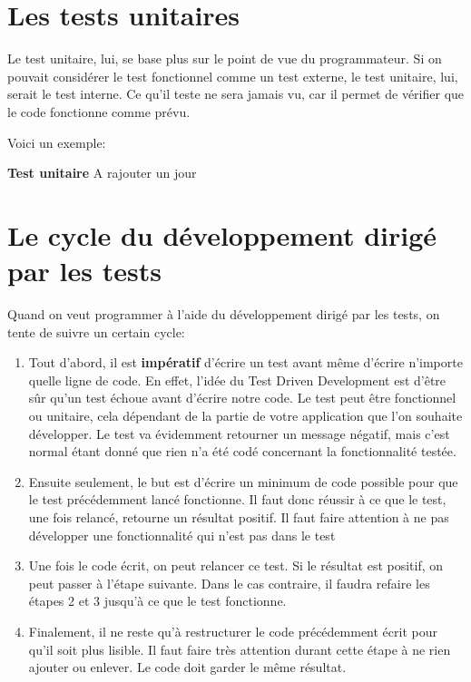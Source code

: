 \documentclass[letterpaper,10pt,french]{sphinxmanual}
\begin{document}
\section{Les tests unitaires}
\label{tdd:les-tests-unitaires}
Le test unitaire, lui, se base plus sur le point de vue du programmateur. Si on
pouvait considérer le test fonctionnel comme un test externe, le test unitaire,
lui, serait le test interne. Ce qu'il teste ne sera jamais vu, car il permet de
vérifier que le code fonctionne comme prévu.

Voici un exemple:

\textbf{Test unitaire} A rajouter un jour


\section{Le cycle du développement dirigé par les tests}
\label{tdd:le-cycle-du-developpement-dirige-par-les-tests}
Quand on veut programmer à l'aide du développement dirigé par les tests, on
tente de suivre un certain cycle:
\begin{enumerate}
\item {} 
Tout d'abord, il est \textbf{impératif} d'écrire un test avant même d'écrire
n'importe quelle ligne de code. En effet, l'idée du Test Driven Development
est d'être sûr qu'un test échoue avant d'écrire notre code. Le test peut
être fonctionnel ou unitaire, cela dépendant de la partie de votre
application que l'on souhaite développer. Le test va évidemment retourner
un message négatif, mais c'est normal étant donné que rien n'a été codé
concernant la fonctionnalité testée.

\item {} 
Ensuite seulement, le but est d'écrire un minimum de code possible
pour que le test précédemment lancé fonctionne. Il faut donc réussir
à ce que le test, une fois relancé, retourne un résultat positif. Il faut
faire attention à ne pas développer une fonctionnalité qui n'est pas dans
le test

\item {} 
Une fois le code écrit, on peut relancer ce test. Si le résultat
est positif, on peut passer à l'étape suivante. Dans le cas contraire,
il faudra refaire les étapes 2 et 3 jusqu'à ce que le test fonctionne.

\item {} 
Finalement, il ne reste qu'à restructurer le code précédemment écrit pour
qu'il soit plus lisible. Il faut faire très attention durant cette étape à
ne rien ajouter ou enlever. Le code doit garder le même résultat.

\end{enumerate}
\end{document}
